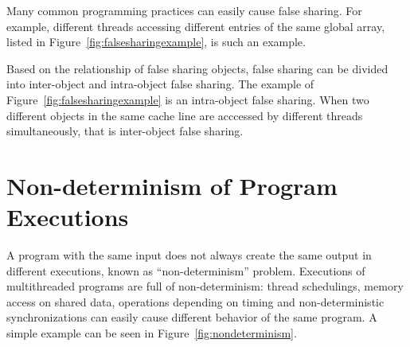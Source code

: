 Many common programming practices can easily cause false sharing. 
For example, different threads accessing different entries of the same global array, listed in 
Figure~\ref{fig:falsesharingexample}, is such an example. 

\begin{figure*}[!ht]
{\centering
\fbox{
\subfigure{}
\hspace{20pt}
\subfigure{}
}
\caption{False sharing problem
\label{fig:falsesharingexample}}
}
\end{figure*}

Based on the relationship of false sharing objects, 
false sharing can be divided into inter-object and intra-object false sharing.
The example of Figure~\ref{fig:falsesharingexample} is an intra-object false sharing.
When two different objects in the same cache line 
are acccessed by different threads simultaneously, that is inter-object 
false sharing.   



\section{Non-determinism of Program Executions}
A program with the same input does not always create the same output in different executions,
known as ``non-determinism'' problem.
Executions of multithreaded programs are full of non-determinism: 
thread schedulings, memory access on shared data, operations depending on timing 
and non-deterministic synchronizations can easily cause different behavior of the same program.
A simple example can be seen in Figure~\ref{fig:nondeterminism}.

\begin{figure*}[!ht]
{\centering
\fbox{
\subfigure{}
\hspace{12pt}
\subfigure{}
\hspace{12pt}
\subfigure{}
}
\caption{Non-determinism problem 
\label{fig:nondeterminism}}
}
\end{figure*}


